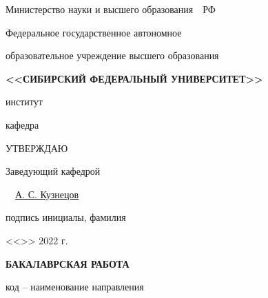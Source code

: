 \begin{spacing}{1}
    \setlength{\parindent}{0cm}

    \centerline{Министерство науки и высшего образования~~РФ}

    \centerline{\small Федеральное государственное автономное}

    \centerline{\small образовательное учреждение высшего образования}

    \centerline{\small\textbf{\MakeUppercase{<<Сибирский Федеральный Университет>>}}}

    \vspace{8pt}

    \centerline{\underline{}}
    \vspace{-4pt}
    \centerline{\footnotesize институт}

    \centerline{\underline{}}
    \vspace{-4pt}
    \centerline{\footnotesize кафедра}

    \vspace{10pt}

    \hfill\begin{minipage}{5.5cm}
        УТВЕРЖДАЮ

        Заведующий кафедрой

        \uline{\hfill}~~\uline{А. С. Кузнецов}

        \vspace{-4pt}
        {\footnotesize \hfill подпись \hfill \hspace{1ex} инициалы, фамилия }

        <<\uline{\hspace{3ex}}>> \uline{\hspace{9ex}} 2022 г.
    \end{minipage}

    \vfill

    \centerline{\bf БАКАЛАВРСКАЯ РАБОТА}
    \vspace{8pt}
    \vspace{8pt}

    \centerline{\underline{}}
    \vspace{-4pt}
    \centerline{\footnotesize код -- наименование направления}
    \vspace{10pt}

    \begin{centering}

        \underline{}\\
        \underline{}


\end{centering}
\end{spacing}
